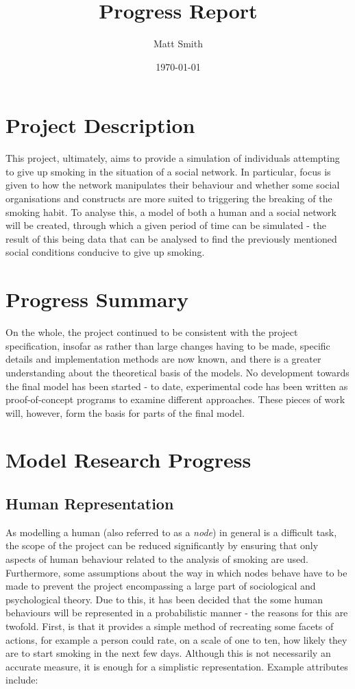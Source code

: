 \documentclass[]{article}
\begin{document}
\title{Progress Report}
\author{Matt Smith}
\date{\today}
\maketitle

\section{Project Description}

This project, ultimately, aims to provide a simulation of individuals attempting to give up smoking in the situation of a social network. In particular, focus is given to how the network manipulates their behaviour and whether some social organisations and constructs are more suited to triggering the breaking of the smoking habit. To analyse this, a model of both a human and a social network will be created, through which a given period of time can be simulated - the result of this being data that can be analysed to find the previously mentioned social conditions conducive to give up smoking.

\section{Progress Summary}

On the whole, the project continued to be consistent with the project specification, insofar as rather than large changes having to be made, specific details and implementation methods are now known, and there is a greater understanding about the theoretical basis of the models. No development towards the final model has been started - to date, experimental code has been written as proof-of-concept programs to examine different approaches. These pieces of work will, however, form the basis for parts of the final model.

\section{Model Research Progress}

\subsection{Human Representation}

As modelling a human (also referred to as a \emph{node}) in general is a difficult task, the scope of the project can be reduced significantly by ensuring that only aspects of human behaviour related to the analysis of smoking are used. Furthermore, some assumptions about the way in which nodes behave have to be made to prevent the project encompassing a large part of sociological and psychological theory. Due to this, it has been decided that the some human behaviours will be represented in a probabilistic manner - the reasons for this are twofold. First, is that it provides a simple method of recreating some facets of actions, for example a person could rate, on a scale of one to ten, how likely they are to start smoking in the next few days. Although this is not necessarily an accurate measure, it is enough for a simplistic representation. Example attributes include:
\end{document}
